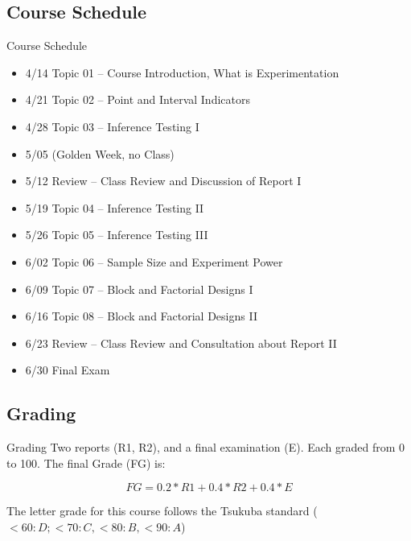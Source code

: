 \documentclass[aspectratio=169]{beamer}
\begin{document}
\begin{CJK}{UTF8}{ipxm}
\subsection{Course Schedule}
\begin{frame}{Course Schedule}{}
  \begin{itemize}
    \item 4/14 Topic 01 -- Course Introduction, What is Experimentation
    \item 4/21 Topic 02 -- Point and Interval Indicators
    \item 4/28 Topic 03 -- Inference Testing I
    \item 5/05 (Golden Week, no Class)
    \item 5/12 Review -- Class Review and Discussion of Report I
    \item 5/19 Topic 04 -- Inference Testing II
    \item 5/26 Topic 05 -- Inference Testing III
    \item 6/02 Topic 06 -- Sample Size and Experiment Power
    \item 6/09 Topic 07 -- Block and Factorial Designs I
    \item 6/16 Topic 08 -- Block and Factorial Designs II
    \item 6/23 Review -- Class Review and Consultation about Report II
    \item 6/30 Final Exam
\end{itemize}
\end{frame}



\subsection{Grading}
\begin{frame}{Grading}
  Two reports (R1, R2), and a final examination (E). Each graded from 0 to 100.
  The final Grade (FG) is:

  \begin{equation*}
    FG = 0.2*R1 + 0.4*R2 + 0.4*E
  \end{equation*}
  \bigskip

  The letter grade for this course follows the Tsukuba standard ($< 60: D; < 70: C, < 80: B, < 90: A$)
\end{frame}


\end{CJK}
\end{document}
